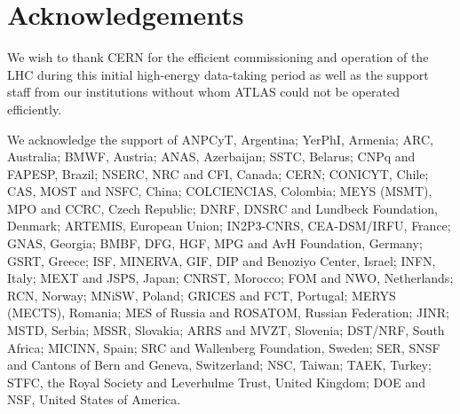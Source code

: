 \documentclass[11pt,a4paper,dvips]{article}
\begin{document}
\section{Acknowledgements}

We wish to thank CERN for the efficient commissioning and operation of the LHC during this initial high-energy data-taking period as well as the support staff from our institutions without whom ATLAS could not be operated efficiently.

We acknowledge the support of ANPCyT, Argentina; YerPhI, Armenia; ARC, Australia; BMWF, Austria; ANAS, Azerbaijan; SSTC, Belarus; CNPq and FAPESP, Brazil; NSERC, NRC and CFI, Canada; CERN; CONICYT, Chile; CAS, MOST and NSFC, China; COLCIENCIAS, Colombia; MEYS (MSMT), MPO and CCRC, Czech Republic; DNRF, DNSRC and Lundbeck Foundation, Denmark; ARTEMIS, European Union; IN2P3-CNRS, CEA-DSM/IRFU, France; GNAS, Georgia; BMBF, DFG, HGF, MPG and AvH Foundation, Germany; GSRT, Greece; ISF, MINERVA, GIF, DIP and Benoziyo Center, Israel; INFN, Italy; MEXT and JSPS, Japan; CNRST, Morocco; FOM and NWO, Netherlands; RCN, Norway;  MNiSW, Poland; GRICES and FCT, Portugal;  MERYS (MECTS), Romania;  MES of Russia and ROSATOM, Russian Federation; JINR; MSTD, Serbia; MSSR, Slovakia; ARRS and MVZT, Slovenia; DST/NRF, South Africa; MICINN, Spain; SRC and Wallenberg Foundation, Sweden; SER,  SNSF and Cantons of Bern and Geneva, Switzerland;  NSC, Taiwan; TAEK, Turkey; STFC, the Royal Society and Leverhulme Trust, United Kingdom; DOE and NSF, United States of America.  
\end{document}
